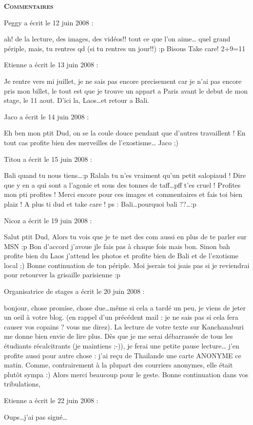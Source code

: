 \bigskip
\textbf{\textsc{Commentaires}}

\medskip
Peggy a écrit le 12 juin 2008 :
\begin{displayquote}
ah! de la lecture, des images, des vidéos!! tout ce que l'on aime\dots
quel grand périple, mais, tu rentres qd (si tu rentres un jour!!) :p
Bisous
Take care!
2+9=11
\end{displayquote}

\medskip
Etienne a écrit le 13 juin 2008 :
\begin{displayquote}
Je rentre vers mi juillet, je ne sais pas encore precisement car je n'ai pas encore pris mon billet, le tout est que je trouve un appart a Paris avant le debut de mon stage, le 11 aout.
D'ici la, Laos\dots et retour a Bali.
\end{displayquote}

\medskip
Jaco a écrit le 14 juin 2008 :
\begin{displayquote}
Eh ben mon ptit Dud, on se la coule douce pendant que d'autres travaillent !
En tout cas profite bien des merveilles de l'exostisme\dots
Jaco ;)
\end{displayquote}

\medskip
Titou a écrit le 15 juin 2008 :
\begin{displayquote}
Bali quand tu nous tiens\dots :p
Ralala tu n'es vraiment qu'un petit salopiaud ! Dire que y en a qui sont a l'agonie et sous des tonnes de taff\dots pff t'es cruel !
Profites mon pti profites !
Merci encore pour ces images et commentaires et fais toi bien plaiz !
A plus ti dud et take care !
ps : Bali\dots pourquoi bali ??\dots :p
\end{displayquote}

\medskip
Nicoz a écrit le 19 juin 2008 :
\begin{displayquote}
Salut ptit Dud,
Alors tu vois que je te met des com aussi en plus de te parler sur MSN :p
Bon d'accord j'avoue jle fais pas à chaque fois mais bon.
Sinon bah profite bien du Laos j'attend les photos et profite bien de Bali et de l'exotisme local ;)
Bonne continuation de ton périple.
Moi jserais toi jsais pas si je reviendrai pour retourver la grisaille parisienne :p
\end{displayquote}

\medskip
Organisatrice de stages a écrit le 20 juin 2008 :
\begin{displayquote}
bonjour,
chose promise, chose due\dots même si cela a tardé un peu, je viens de jeter un oeil à votre blog. (en rappel d'un précédent mail : je ne sais pas si cela fera causer vos copains ? vous me direz).
La lecture de votre texte sur Kanchanaburi me donne bien envie de lire plus. Dès que je me serai débarrassée de tous les étudiants récalcitrants (je maintiens ;-)), je ferai une petite pause lecture\dots
j'en profite aussi pour autre chose : j'ai reçu de Thailande une carte ANONYME ce matin. Comme, contrairement à la plupart des courriers anonymes, elle était plutôt sympa :) Alors merci beaucoup pour le geste.
Bonne continuation dans vos tribulations,
\end{displayquote}

\medskip
Etienne a écrit le 22 juin 2008 :
\begin{displayquote}
Oups\dots j'ai pas signé\dots
\end{displayquote}

\vfill
